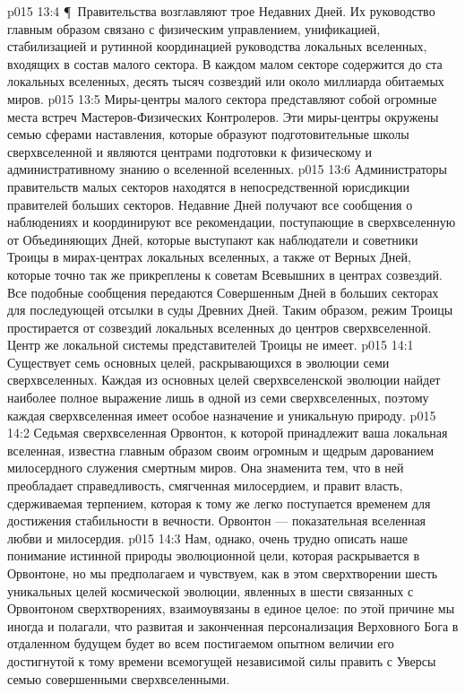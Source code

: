 \vs p015 13:4 \P\ Правительства  возглавляют трое Недавних Дней. Их руководство главным образом связано с физическим управлением, унификацией, стабилизацией и рутинной координацией руководства локальных вселенных, входящих в состав малого сектора. В каждом малом секторе содержится до ста локальных вселенных, десять тысяч созвездий или около миллиарда обитаемых миров.
\vs p015 13:5 Миры\hyp{}центры малого сектора представляют собой огромные места встреч Мастеров\hyp{}Физических Контролеров. Эти миры\hyp{}центры окружены семью сферами наставления, которые образуют подготовительные школы сверхвселенной и являются центрами подготовки к физическому и административному знанию о вселенной вселенных.
\vs p015 13:6 Администраторы правительств малых секторов находятся в непосредственной юрисдикции правителей больших секторов. Недавние Дней получают все сообщения о наблюдениях и координируют все рекомендации, поступающие в сверхвселенную от Объединяющих Дней, которые выступают как наблюдатели и советники Троицы в мирах\hyp{}центрах локальных вселенных, а также от Верных Дней, которые точно так же прикреплены к советам Всевышних в центрах созвездий. Все подобные сообщения передаются Совершенным Дней в больших секторах для последующей отсылки в суды Древних Дней. Таким образом, режим Троицы простирается от созвездий локальных вселенных до центров сверхвселенной. Центр же локальной системы представителей Троицы не имеет.
\vs p015 14:1 Существует семь основных целей, раскрывающихся в эволюции семи сверхвселенных. Каждая из основных целей сверхвселенской эволюции найдет наиболее полное выражение лишь в одной из семи сверхвселенных, поэтому каждая сверхвселенная имеет особое назначение и уникальную природу.
\vs p015 14:2 Седьмая сверхвселенная Орвонтон, к которой принадлежит ваша локальная вселенная, известна главным образом своим огромным и щедрым дарованием милосердного служения смертным миров. Она знаменита тем, что в ней преобладает справедливость, смягченная милосердием, и правит власть, сдерживаемая терпением, которая к тому же легко поступается временем для достижения стабильности в вечности. Орвонтон --- показательная вселенная любви и милосердия.
\vs p015 14:3 Нам, однако, очень трудно описать наше понимание истинной природы эволюционной цели, которая раскрывается в Орвонтоне, но мы предполагаем и чувствуем, как в этом сверхтворении шесть уникальных целей космической эволюции, явленных в шести связанных с Орвонтоном сверхтворениях, взаимоувязаны в единое целое: по этой причине мы иногда и полагали, что развитая и законченная персонализация Верховного Бога в отдаленном будущем будет во всем постигаемом опытном величии его достигнутой к тому времени всемогущей независимой силы править с Уверсы семью совершенными сверхвселенными.
